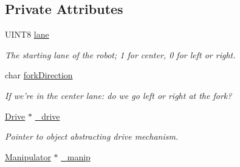 \subsection*{Private Attributes}
\begin{DoxyCompactItemize}
\item 
\hypertarget{class_r_j_f_r_c2011_1_1_autonomous_a250e8a5a9a38ae5bba7457df67e05462}{
UINT8 \hyperlink{class_r_j_f_r_c2011_1_1_autonomous_a250e8a5a9a38ae5bba7457df67e05462}{lane}}
\label{class_r_j_f_r_c2011_1_1_autonomous_a250e8a5a9a38ae5bba7457df67e05462}

\begin{DoxyCompactList}\small\item\em The starting lane of the robot; 1 for center, 0 for left or right. \item\end{DoxyCompactList}\item 
\hypertarget{class_r_j_f_r_c2011_1_1_autonomous_abcfa4840dd66568b3e263a36d9941bbc}{
char \hyperlink{class_r_j_f_r_c2011_1_1_autonomous_abcfa4840dd66568b3e263a36d9941bbc}{forkDirection}}
\label{class_r_j_f_r_c2011_1_1_autonomous_abcfa4840dd66568b3e263a36d9941bbc}

\begin{DoxyCompactList}\small\item\em If we're in the center lane: do we go left or right at the fork? \item\end{DoxyCompactList}\item 
\hypertarget{class_r_j_f_r_c2011_1_1_autonomous_a15f4f4554332e90259e12aec3baa827b}{
\hyperlink{class_r_j_f_r_c2011_1_1_drive}{Drive} $\ast$ \hyperlink{class_r_j_f_r_c2011_1_1_autonomous_a15f4f4554332e90259e12aec3baa827b}{\_\-drive}}
\label{class_r_j_f_r_c2011_1_1_autonomous_a15f4f4554332e90259e12aec3baa827b}

\begin{DoxyCompactList}\small\item\em Pointer to object abstracting drive mechanism. \item\end{DoxyCompactList}\item 
\hypertarget{class_r_j_f_r_c2011_1_1_autonomous_acaeb4cd9803595987b7fa237247ecd70}{
\hyperlink{class_r_j_f_r_c2011_1_1_manipulator}{Manipulator} $\ast$ \hyperlink{class_r_j_f_r_c2011_1_1_autonomous_acaeb4cd9803595987b7fa237247ecd70}{\_\-manip}}
\label{class_r_j_f_r_c2011_1_1_autonomous_acaeb4cd9803595987b7fa237247ecd70}


\end{DoxyCompactItemize}
